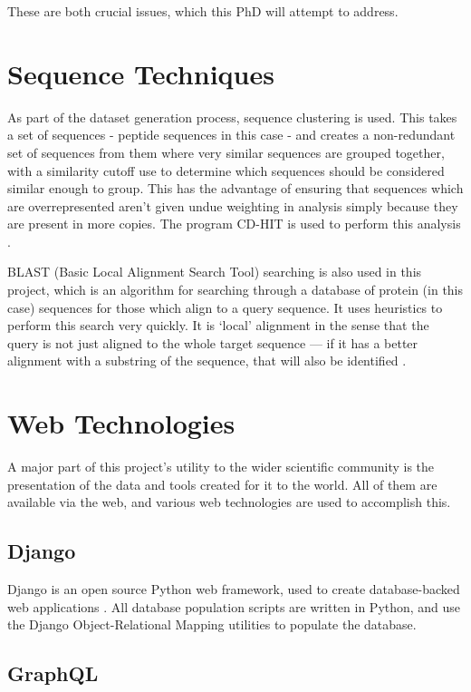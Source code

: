 These are both crucial issues, which this PhD will attempt to address.

\section{Sequence Techniques}

As part of the dataset generation process, sequence clustering is used. This takes a set of sequences - peptide sequences in this case - and creates a non-redundant set of sequences from them where very similar sequences are grouped together, with a similarity cutoff use to determine which sequences should be considered similar enough to group. This has the advantage of ensuring that sequences which are overrepresented aren't given undue weighting in analysis simply because they are present in more copies. The program CD-HIT is used to perform this analysis \cite{li2006cdhit}.

BLAST (Basic Local Alignment Search Tool) searching is also used in this project, which is an algorithm for searching through a database of protein (in this case) sequences for those which align to a query sequence. It uses heuristics to perform this search very quickly. It is `local' alignment in the sense that the query is not just aligned to the whole target sequence --- if it has a better alignment with a substring of the sequence, that will also be identified \cite{zhang2000blast}.

\section{Web Technologies}

A major part of this project's utility to the wider scientific community is the presentation of the data and tools created for it to the world. All of them are available via the web, and various web technologies are used to accomplish this.

\subsection{Django}

Django is an open source Python web framework, used to create database-backed web applications \cite{django}. All database population scripts are written in Python, and use the Django Object-Relational Mapping utilities to populate the database.

\subsection{GraphQL}

